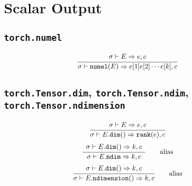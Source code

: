 \documentclass{article}
\begin{document}
\nointerlineskip
\par\noindent
\setlength{\parindent}{0pt}


\section*{Scalar Output}
\subsection*{\texttt{torch.numel}}
\begin{align*}
  \frac
  {
    \begin{array}{l}
      \sigma \vdash E \Rightarrow e, c
    \end{array}
  }
  {
    \sigma \vdash \mathtt{numel(}E\mathtt{)} \Rightarrow e[1] e[2] \cdots e[k], c
  }
\end{align*}

\subsection*{\texttt{torch.Tensor.dim}, \texttt{torch.Tensor.ndim},
\texttt{torch.Tensor.ndimension}}
\begin{align*}
  \frac
  {
    \begin{array}{l}
      \sigma \vdash E \Rightarrow e, c
    \end{array}
  }
  {
    \sigma \vdash E.\mathtt{dim(}\mathtt{)} \Rightarrow \mathtt{rank(}e\mathtt{)}, c
  }
\end{align*}
\begin{align*}
  \frac
  {
    \begin{array}{l}
      \sigma \vdash E.\mathtt{dim(}\mathtt{)} \Rightarrow k, c
    \end{array}
  }
  {
    \sigma \vdash E.\mathtt{ndim} \Rightarrow k, c
  }
  \tag*{alias}
\end{align*}
\begin{align*}
  \frac
  {
    \begin{array}{l}
      \sigma \vdash E.\mathtt{dim(}\mathtt{)} \Rightarrow k, c
    \end{array}
  }
  {
    \sigma \vdash E.\mathtt{ndimension()} \Rightarrow k, c
  }
  \tag*{alias}
\end{align*}
\end{document}
